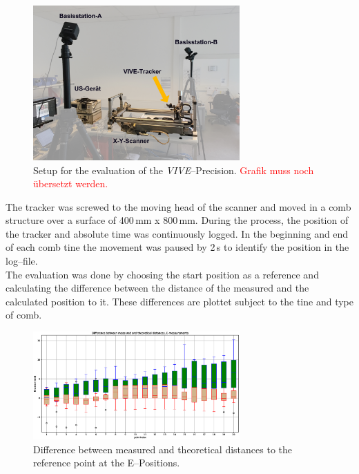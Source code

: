 \documentclass{VRARWorkshop}
\begin{document}
\begin{figure}[h!]
    \begin{center}
        \includegraphics[width=79mm]{images/PrecisionMeasurement.jpg}
        \caption{\label{fig:precisionMeasurementSetup} Setup for the evaluation of the \textit{VIVE}--Precision. \textcolor{red}{Grafik muss noch übersetzt werden.}}
    \end{center}
\end{figure}

The tracker was screwed to the moving head of the scanner and moved in a comb structure over a surface of 400\,mm x 800\,mm.
During the process, the position of the tracker and absolute time was continuously logged.
In the beginning and end of each comb tine the movement was paused by 2\,s to identify the position in the log--file.\\

The evaluation was done by choosing the start position as a reference and calculating the difference between the distance of the measured and the calculated position to it.
These differences are plottet subject to the tine and type of comb.

\begin{figure}[h!]
    \begin{center}
        \includegraphics[width=79mm]{images/distancesBoxplot-E.eps}
        \caption{\label{fig:boxplotE} Difference between measured and theoretical distances to the reference point at the E--Positions.}
    \end{center}
\end{figure}
\end{document}
